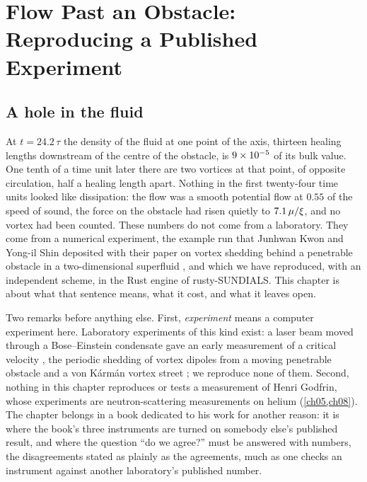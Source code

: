 \chapter{Flow Past an Obstacle: Reproducing a Published Experiment}\label{ch09}

\section{A hole in the fluid}\label{ch09:hole}

At $t=24.2\,\tau$ the density of the fluid at one point of the axis, thirteen healing lengths downstream of the centre of the obstacle, is $9\times10^{-5}$ of its bulk value. One tenth of a time unit later there are two vortices at that point, of opposite circulation, half a healing length apart. Nothing in the first twenty-four time units looked like dissipation: the flow was a smooth potential flow at $0.55$ of the speed of sound, the force on the obstacle had risen quietly to $7.1\,\mu/\xi$, and no vortex had been counted. These numbers do not come from a laboratory. They come from a numerical experiment, the example run that Junhwan Kwon and Yong-il Shin deposited with their paper on vortex shedding behind a penetrable obstacle in a two-dimensional superfluid \cite{KwonShin2026prr,KwonShin2026data}, and which we have reproduced, with an independent scheme, in the Rust engine of rusty-SUNDIALS. This chapter is about what that sentence means, what it cost, and what it leaves open.

Two remarks before anything else. First, \emph{experiment} means a computer experiment here. Laboratory experiments of this kind exist: a laser beam moved through a Bose--Einstein condensate gave an early measurement of a critical velocity \cite{Raman1999}, the periodic shedding of vortex dipoles from a moving penetrable obstacle \cite{Kwon2015PRA} and a von Kármán vortex street \cite{Kwon2016PRL}; we reproduce none of them. Second, nothing in this chapter reproduces or tests a measurement of Henri Godfrin, whose experiments are neutron-scattering measurements on helium (\cref{ch05,ch08}). The chapter belongs in a book dedicated to his work for another reason: it is where the book's three instruments are turned on somebody else's published result, and where the question ``do we agree?'' must be answered with numbers, the disagreements stated as plainly as the agreements, much as one checks an instrument against another laboratory's published number.

